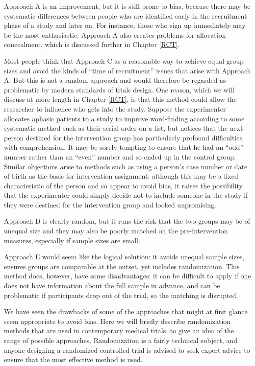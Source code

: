 \documentclass{krantz}
\begin{document}
Approach A is an improvement, but it is still prone to bias, because there may be systematic differences between people who are identified early in the recruitment phase of a study and later on. For instance, those who sign up immediately may be the most enthusiastic. Approach A also creates problems for allocation concealment, which is discussed further in Chapter \ref{RCT}.

Most people think that Approach C as a reasonable way to achieve equal group sizes and avoid the kinds of ``time of recruitment'' issues that arise with Approach A. But this is not a random approach and would therefore be regarded as problematic by modern standards of trials design. One reason, which we will discuss at more length in Chapter \ref{RCT}, is that this method could allow the researcher to influence who gets into the study. Suppose the experimenter allocates aphasic patients to a study to improve word-finding according to some systematic method such as their serial order on a list, but notices that the next person destined for the intervention group has particularly profound difficulties with comprehension. It may be sorely tempting to ensure that he had an ``odd'' number rather than an ``even'' number and so ended up in the control group. Similar objections arise to methods such as using a person's case number or date of birth as the basis for intervention assignment: although this may be a fixed characteristic of the person and so appear to avoid bias, it raises the possibility that the experimenter could simply decide not to include someone in the study if they were destined for the intervention group and looked unpromising.

Approach D is clearly random, but it runs the risk that the two groups may be of unequal size and they may also be poorly matched on the pre-intervention measures, especially if sample sizes are small.

Approach E would seem like the logical solution: it avoids unequal sample sizes, ensures groups are comparable at the outset, yet includes randomization. This method does, however, have some disadvantages: it can be difficult to apply if one does not have information about the full sample in advance, and can be problematic if participants drop out of the trial, so the matching is disrupted.

We have seen the drawbacks of some of the approaches that might at first glance seem appropriate to avoid bias. Here we will briefly describe randomization methods that are used in contemporary medical trials, to give an idea of the range of possible approaches. Randomization is a fairly technical subject, and anyone designing a randomized controlled trial is advised to seek expert advice to ensure that the most effective method is used.
\end{document}

